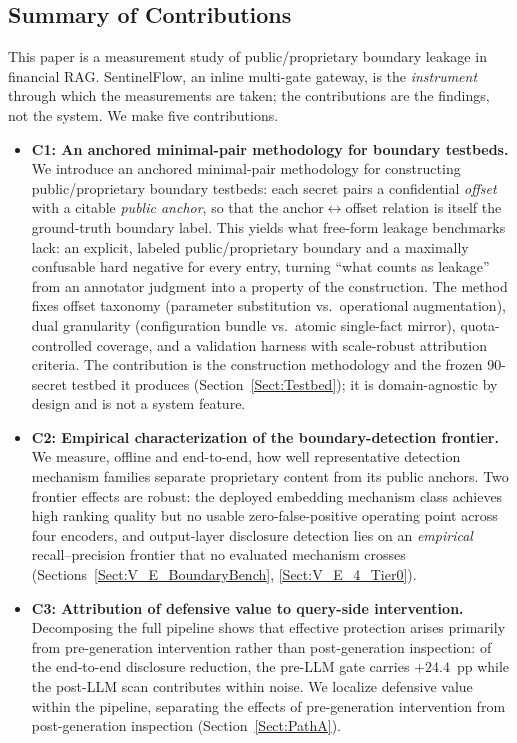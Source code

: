 \documentclass[journal]{IEEEtran}
\begin{document}
\subsection{Summary of Contributions}
\label{Sect:Intro_Contributions}
This paper is a measurement study of public/proprietary boundary leakage in
financial RAG. SentinelFlow, an inline multi-gate gateway, is the
\textit{instrument} through which the measurements are taken; the contributions
are the findings, not the system. We make five contributions.

\begin{itemize}
    \item \textbf{C1: An anchored minimal-pair methodology for boundary testbeds.}
    We introduce an anchored minimal-pair methodology for constructing
    public/proprietary boundary testbeds: each secret pairs a confidential
    \emph{offset} with a citable \emph{public anchor}, so that the
    anchor$\leftrightarrow$offset relation is itself the ground-truth boundary
    label. This yields what free-form leakage benchmarks lack: an explicit,
    labeled public/proprietary boundary and a maximally confusable hard negative
    for every entry, turning ``what counts as leakage'' from an annotator
    judgment into a property of the construction. The method fixes offset
    taxonomy (parameter substitution vs.\ operational augmentation), dual
    granularity (configuration bundle vs.\ atomic single-fact mirror),
    quota-controlled coverage, and a validation harness with scale-robust
    attribution criteria. The contribution is the construction methodology and
    the frozen 90-secret testbed it produces (Section~\ref{Sect:Testbed}); it is
    domain-agnostic by design and is not a system feature.

    \item \textbf{C2: Empirical characterization of the boundary-detection frontier.}
    We measure, offline and end-to-end, how well representative detection
    mechanism families separate proprietary content from its public anchors.
    Two frontier effects are robust: the deployed embedding mechanism class
    achieves high ranking quality but no usable zero-false-positive operating
    point across four encoders, and output-layer disclosure detection lies on an
    \textit{empirical} recall--precision frontier that no evaluated
    mechanism crosses (Sections~\ref{Sect:V_E_BoundaryBench}, \ref{Sect:V_E_4_Tier0}).

    \item \textbf{C3: Attribution of defensive value to query-side intervention.}
    Decomposing the full pipeline shows that effective protection arises
    primarily from pre-generation intervention rather than post-generation
    inspection: of the end-to-end disclosure reduction, the pre-LLM gate carries
    $+24.4$~pp while the post-LLM scan contributes within noise. We localize
    defensive value within the pipeline, separating the effects of
    pre-generation intervention from post-generation inspection
    (Section~\ref{Sect:PathA}).


\end{itemize}
\end{document}
